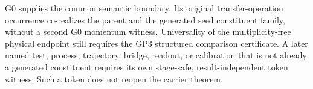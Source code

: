 \documentclass[12pt,a4paper]{article}
\begin{document}
G0 supplies the common semantic boundary.  Its original transfer-operation
occurrence co-realizes the parent and the generated seed constituent family,
without a second G0 momentum witness.  Universality of the multiplicity-free
physical endpoint still requires the GP3 structured comparison certificate.  A later named test, process, trajectory,
bridge, readout, or calibration that is not already a generated constituent
requires its own stage-safe, result-independent token witness.  Such a token
does not reopen the carrier theorem.


\printbibliography
\end{document}
